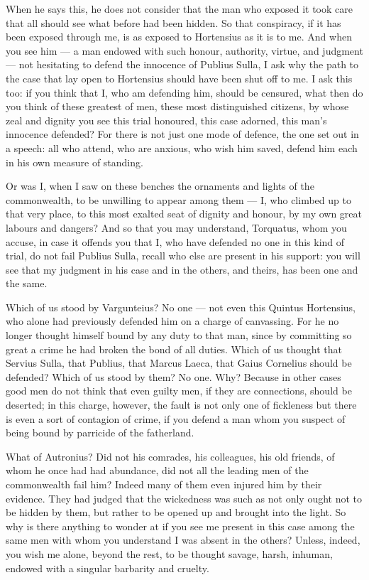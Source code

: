  When he says this, he does not consider that the man who exposed it took care that all should see what before had been hidden. So that conspiracy, if it has been exposed through me, is as exposed to Hortensius as it is to me. And when you see him --- a man endowed with such honour, authority, virtue, and judgment --- not hesitating to defend the innocence of Publius Sulla, I ask why the path to the case that lay open to Hortensius should have been shut off to me. I ask this too: if you think that I, who am defending him, should be censured, what then do you think of these greatest of men, these most distinguished citizens, by whose zeal and dignity you see this trial honoured, this case adorned, this man's innocence defended? For there is not just one mode of defence, the one set out in a speech: all who attend, who are anxious, who wish him saved, defend him each in his own measure of standing.

 Or was I, when I saw on these benches the ornaments and lights of the commonwealth, to be unwilling to appear among them --- I, who climbed up to that very place, to this most exalted seat of dignity and honour, by my own great labours and dangers? And so that you may understand, Torquatus, whom you accuse, in case it offends you that I, who have defended no one in this kind of trial, do not fail Publius Sulla, recall who else are present in his support: you will see that my judgment in his case and in the others, and theirs, has been one and the same.

 Which of us stood by Vargunteius? No one --- not even this Quintus Hortensius, who alone had previously defended him on a charge of canvassing. For he no longer thought himself bound by any duty to that man, since by committing so great a crime he had broken the bond of all duties. Which of us thought that Servius Sulla, that Publius, that Marcus Laeca, that Gaius Cornelius should be defended? Which of us stood by them? No one. Why? Because in other cases good men do not think that even guilty men, if they are connections, should be deserted; in this charge, however, the fault is not only one of fickleness but there is even a sort of contagion of crime, if you defend a man whom you suspect of being bound by parricide of the fatherland.

 What of Autronius? Did not his comrades, his colleagues, his old friends, of whom he once had had abundance, did not all the leading men of the commonwealth fail him? Indeed many of them even injured him by their evidence. They had judged that the wickedness was such as not only ought not to be hidden by them, but rather to be opened up and brought into the light. So why is there anything to wonder at if you see me present in this case among the same men with whom you understand I was absent in the others? Unless, indeed, you wish me alone, beyond the rest, to be thought savage, harsh, inhuman, endowed with a singular barbarity and cruelty.

